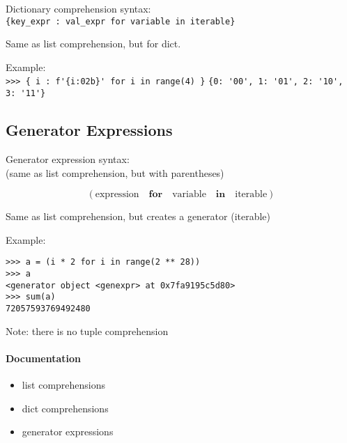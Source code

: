 \documentclass[12pt]{article}
\begin{document}
Dictionary comprehension syntax:\\
\verb|{key_expr : val_expr for variable in iterable}|

Same as list comprehension, but for dict.

Example:\\
\verb|>>> { i : f'{i:02b}' for i in range(4) }|
\verb|{0: '00', 1: '01', 2: '10', 3: '11'}|



\subsection{Generator Expressions}

Generator expression syntax: \\
(same as list comprehension, but with parentheses)

\begin{equation*}
(\text{expression} \quad \textbf{for} \quad \text{variable} \quad \textbf{in} \quad \text{iterable} )
\end{equation*}

Same as list comprehension, but creates a generator (iterable)

Example:

\begin{lstlisting}
>>> a = (i * 2 for i in range(2 ** 28))
>>> a
<generator object <genexpr> at 0x7fa9195c5d80>
>>> sum(a)
72057593769492480
\end{lstlisting}


Note: there is no tuple comprehension

\paragraph{Documentation}
\begin{itemize}
    \item list comprehensions
    \item dict comprehensions
    \item generator expressions
\end{itemize}
\end{document}
